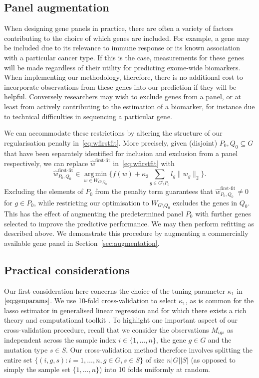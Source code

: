 \documentclass[10pt,twoside,openright]{report}
\DeclareMathOperator*{\argmin}{arg\,min}
\begin{document}
\subsection{Panel augmentation \label{sec:panelaugmentation}}
When designing gene panels in practice, there are often a variety of factors contributing to the choice of which genes are included. For example, a gene may be included due to its relevance to immune response or its known association with a particular cancer type. If this is the case, measurements for these genes will be made regardless of their utility for predicting exome-wide biomarkers. When implementing our methodology, therefore, there is no additional cost to incorporate observations from these genes into our prediction if they will be helpful. Conversely researchers may wish to exclude genes from a panel, or at least from actively contributing to the estimation of a biomarker, for instance due to technical difficulties in sequencing a particular gene. 

We can accommodate these restrictions by altering the structure of our regularisation penalty in~\eqref{eq:wfirstfit}.  More precisely, given (disjoint) $P_0, Q_0 \subseteq G$ that have been separately identified for inclusion and exclusion from a panel respectively, we can replace $\hat{w}^{\text{first-fit}}$ in~\eqref{eq:wfirstfit} with 
\begin{equation} \label{eq:augment}
\hat{w}_{P_0, Q_0}^{\text{first-fit}} \in \argmin\limits_{w \in W_{G \setminus Q_0}} \bigl\{ f(w) + \kappa_2 \sum_{g \in G\setminus P_0} l_g \|w_g\|_2 \bigr\}.  
\end{equation}
Excluding the elements of $P_0$ from the penalty term guarantees that $\hat{w}_{P_0, Q_0}^{\text{first-fit}} \neq 0$ for $g \in P_0$, while restricting our optimisation to $W_{G \setminus Q_0}$ excludes the genes in $Q_0$. This has the effect of augmenting the predetermined panel $P_0$ with further genes selected to improve the predictive performance. We may then perform refitting as described above. We demonstrate this procedure by augmenting a commercially available gene panel in Section~\ref{sec:augmentation}.

\subsection{Practical considerations \label{sec:practicalconsiderations}}
Our first consideration here concerns the choice of the tuning parameter $\kappa_1$ in $\eqref{eq:genparams}$. We use 10-fold cross-validation to select $\kappa_1$, as is common for the \acrshort{lasso} estimator in generalised linear regression and for which there exists a rich theory and computational toolkit \citep{michoel_natural_2016, friedman_glmnet_2020}. To highlight one important aspect of our cross-validation procedure, recall that we consider the observations $M_{igs}$ as independent across the sample index $i \in \{1, \ldots, n\}$, the gene $g\in G$ and the mutation type $s\in S$. Our cross-validation method therefore involves splitting the entire set $\{(i,g,s): i = 1, \ldots, n, g \in G, s \in S\}$ of size $n|G||S|$ (as opposed to simply the sample set $\{1, \ldots, n\}$) into 10 folds uniformly at random.
\end{document}
